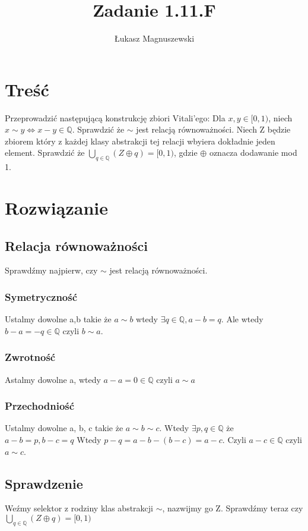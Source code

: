 \documentclass{article}
\title{Zadanie 1.11.F}
\author{Łukasz Magnuszewski}
\date{\vspace{-5ex}}
\begin{document}
\maketitle
\section*{Treść}
Przeprowadzić następującą konstrukcję zbiori Vitali'ego: Dla $x,y \in [0,1)$,
niech $x \sim  y \iff x - y \in \mathbb{Q}$. Sprawdzić że $\sim$ jest relacją równoważności. Niech Z będzie zbiorem który z każdej klasy abstrakcji tej relacji wbyiera dokładnie jeden element. Sprawdzić że $\bigcup_{q \in \mathbb{Q}} (Z \oplus q) = [0,1)$, gdzie $ \oplus$ oznacza dodawanie mod 1.

\section*{Rozwiązanie}
\subsection*{Relacja równoważności}
Sprawdźmy najpierw, czy $\sim$ jest relacją równoważności.
\subsubsection*{Symetryczność}
Ustalmy dowolne a,b takie że $a \sim b$ wtedy $\exists q \in \mathbb{Q}, a - b = q$.
Ale wtedy $b - a = -q \in \mathbb{Q}$ czyli $b \sim a$.

\subsubsection*{Zwrotność}
Astalmy dowolne a, wtedy $a-a = 0 \in \mathbb{Q}$ czyli $ a \sim a$


\subsubsection*{Przechodniość}
Ustalmy dowolne a, b, c takie że $a \sim b \sim c$. Wtedy $\exists p,q \in \mathbb{Q}$ że $a-b= p, b-c = q$ Wtedy $p - q = a-b - (b-c) = a - c$. Czyli $a-c \in \mathbb{Q}$ czyli $a \sim c$.

\subsection*{Sprawdzenie}

Weźmy selektor z rodziny klas abstrakcji $\sim$, nazwijmy go Z.
Sprawdźmy teraz czy $\bigcup_{q \in \mathbb{Q}} (Z \oplus q) = [0,1)$
\end{document}
